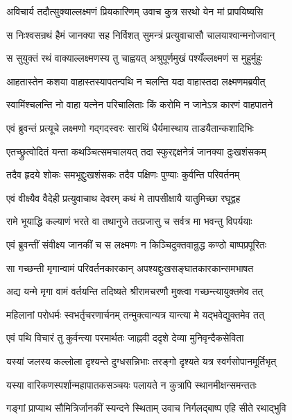 \twolineshloka
{अविचार्य तदौत्सुक्याल्लक्ष्मणं प्रियकारिणम्}
{उवाच कुत्र सरथो येन मां प्रापयिष्यसि}%

\twolineshloka
{स निःश्वसन्रथं हैमं जानक्या सह निर्विशत्}
{सुमन्त्रं प्रत्युवाचासौ चालयाश्वान्मनोजवान्}%

\twolineshloka
{स सुयुक्तं रथं वाक्याल्लक्ष्मणस्य तु चाह्वयत्}
{अश्रुपूर्णमुखं पश्यँल्लक्ष्मणं स मुहुर्मुहुः}%

\twolineshloka
{आहतास्तेन कशया वाहास्तस्यापतन्पथि}
{न चलन्ति यदा वाहास्तदा लक्ष्मणमब्रवीत्}%


\twolineshloka
{स्वामिंश्चलन्ति नो वाहा यत्नेन परिचालिताः}
{किं करोमि न जानेऽत्र कारणं वाहपातने}%

\twolineshloka
{एवं ब्रुवन्तं प्रत्यूचे लक्ष्मणो गद्गदस्वरः}
{सारथिं धैर्यमास्थाय ताडयैतान्कशादिभिः}%

\twolineshloka
{एतच्छ्रुत्वोदितं यन्ता कथञ्चित्समचालयत्}
{तदा स्फुरद्दक्षनेत्रं जानक्या दुःखशंसकम्}%

\twolineshloka
{तदैव हृदये शोकः समभूद्दुःखशंसकः}
{तदैव पक्षिणः पुण्याः कुर्वन्ति परिवर्तनम्}%

\twolineshloka
{एवं वीक्ष्यैव वैदेही प्रत्युवाचाथ देवरम्}
{कथं मे तापसीक्षायै यातुमिच्छा रघूद्वह}%

\twolineshloka
{रामे भूयाद्धि कल्याणं भरते वा तथानुजे}
{तत्प्रजासु च सर्वत्र मा भवन्तु विपर्ययाः}%

\twolineshloka
{एवं ब्रुवन्तीं संवीक्ष्य जानकीं च स लक्ष्मणः}
{न किञ्चिदुक्तवान्रुद्ध कण्ठो बाष्पप्रपूरितः}%

\twolineshloka
{सा गच्छन्ती मृगान्वामं परिवर्तनकारकान्}
{अपश्यद्दुःखसङ्घातकारकान्समभाषत}%

\twolineshloka
{अद्य यन्मे मृगा वामं वर्तयन्ति तदिष्यते}
{श्रीरामचरणौ मुक्त्वा गच्छन्त्यायुक्तमेव तत्}%

\twolineshloka
{महिलानां परोधर्मः स्वभर्तृचरणार्चनम्}
{तन्मुक्त्वान्यत्र यान्त्या मे यद्भवेद्युक्तमेव तत्}%

\twolineshloka
{एवं पथि विचारं तु कुर्वन्त्या परमार्थतः}
{जाह्नवी ददृशे देव्या मुनिवृन्दैकसेविता}%

\twolineshloka
{यस्यां जलस्य कल्लोला दृश्यन्ते दुग्धसन्निभाः}
{तरङ्गो दृश्यते यत्र स्वर्गसोपानमूर्तिभृत्}%

\twolineshloka
{यस्या वारिकणस्पर्शान्महापातकसञ्चयः}
{पलायते न कुत्रापि स्थानमीक्षन्समन्ततः}%

\twolineshloka
{गङ्गां प्राप्याथ सौमित्रिर्जानकीं स्यन्दने स्थिताम्}
{उवाच निर्गलद्बाष्प एहि सीते रथाद्भुवि}%

